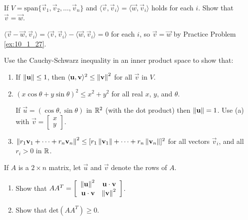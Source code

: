 \documentclass{ximera}
\begin{document}
\begin{problem}\label{prob:inner_prod_28}
If $V = \mbox{span}\{\vec{v}_{1}, \vec{v}_{2}, \dots, \vec{v}_{n}\}$ and $\langle\vec{v}, \vec{v}_{i}\rangle = \langle\vec{w}, \vec{v}_i\rangle$ holds for each $i$. Show that $\vec{v} = \vec{w}$.

\begin{hint}
$\langle \vec{v} - \vec{w}, \vec{v}_{i} \rangle = \langle \vec{v}, \vec{v}_{i} \rangle - \langle \vec{w}, \vec{v}_{i} \rangle = 0$ for each $i$, so $\vec{v} = \vec{w}$ by Practice Problem \ref{ex:10_1_27}.
\end{hint}
\end{problem}

\begin{problem}\label{prob:inner_prod_29}
Use the Cauchy-Schwarz inequality in an inner product space to show that:

\begin{enumerate} 
\item If $\left\lVert\mathbf{u}\right\rVert \leq 1$, then $\langle\mathbf{u}, \mathbf{v}\rangle^{2} \leq \left\lVert\mathbf{v}\right\rVert^{2}$ for all $\vec{v}$ in $V$.

\item $(x \cos \theta + y \sin \theta)^{2} \leq x^{2} + y^{2}$ for all real $x$, $y$, and $\theta$.

\begin{hint}
If $\vec{u} = (\cos \theta, \sin \theta)$ in $\mathbb{R}^2$ (with the dot product) then $\left\lVert\mathbf{u}\right\rVert = 1$. Use (a) with $\vec{v} = \begin{bmatrix}x\\ y\end{bmatrix}$.
\end{hint}

\item $\left\lVert r_1\mathbf{v}_1 + \dots + r_n\mathbf{v}_n \right\rVert ^2 \leq [r_1 \left\lVert \mathbf{v}_1 \right\rVert + \dots + r_n \left\lVert \mathbf{v}_n \right\rVert ]^2$
for all vectors $\vec{v}_{i}$, and all $r_{i} > 0$ in $\mathbb{R}$.

\end{enumerate}

\end{problem}

\begin{problem}\label{prob:inner_prod_30}
If $A$ is a $2 \times n$ matrix, let $\vec{u}$ and $\vec{v}$ denote the rows of $A$.

\begin{enumerate} 
\item Show that
$AA^T = \left[ \begin{array}{rr}
\left\lVert \mathbf{u} \right\rVert ^2 & \mathbf{u} \cdot \mathbf{v} \\
\mathbf{u} \cdot \mathbf{v} & \left\lVert \mathbf{v} \right\rVert ^2
\end{array} \right]$.

\item Show that $\mbox{det}(AA^{T}) \geq 0$.

\end{enumerate}
\end{problem}
\end{document}
